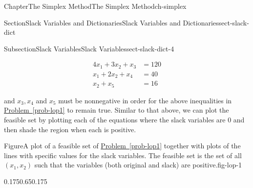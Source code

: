 \documentclass[oneside,10pt,]{book}
\newcommand{\xreffont}{\relax}
\numberwithin{equation}{section}
\newcommand{\amp}{&}
\begin{document}
\begin{chapterptx}{Chapter}{The Simplex Method}{}{The Simplex Method}{}{}{ch-simplex}
\begin{sectionptx}{Section}{Slack Variables and Dictionaries}{}{Slack Variables and Dictionaries}{}{}{sect-slack-dict}
\begin{subsectionptx}{Subsection}{Slack Variables}{}{Slack Variables}{}{}{sect-slack-dict-4}
\par
%
\begin{equation}
\begin{aligned} 4x_1 + 3x_2 + x_3 \amp = 120 \\ x_1 + 2x_2 + x_4 \amp = 40 \\ x_2 + x_5 \amp = 16 \end{aligned}\label{eq-inequalities-slack}
\end{equation}
%
\par
and \(x_3, x_4\) and \(x_5\) must be nonnegative in order for the above inequalities in \hyperref[prob-lop1]{Problem~{\xreffont\ref{prob-lop1}}} to remain true. Similar to that above, we can plot the feasible set by plotting each of the equations where the slack variables are 0 and then shade the region when each is positive.%
\begin{figureptx}{Figure}{A plot of a feasible set of \hyperref[prob-lop1]{Problem~{\xreffont\ref{prob-lop1}}} together with plots of the lines with specific values for the slack variables. The feasible set is the set of all \((x_1, x_2)\) such that the variables (both original and slack) are positive.}{fig-lop-1}{}%
\begin{image}{0.175}{0.65}{0.175}{}%
%
\end{image}%
\tcblower
\end{figureptx}%

\end{subsectionptx}
\end{sectionptx}
\end{chapterptx}
\end{document}
